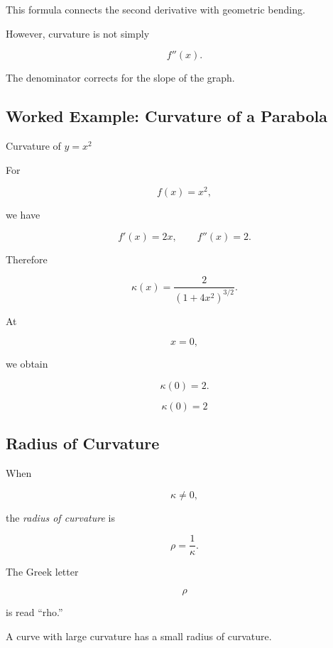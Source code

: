 This formula connects the second derivative with geometric bending.

However, curvature is not simply

\[
f''(x).
\]

The denominator corrects for the slope of the graph.

\subsection{Worked Example: Curvature of a Parabola}
\label{subsec:worked-curvature-parabola}

\begin{workedexamplebox}{Curvature of \(y=x^2\)}

For

\[
f(x)=x^2,
\]

we have

\[
f'(x)=2x,
\qquad
f''(x)=2.
\]

Therefore

\[
\kappa(x)
=
\frac{2}
{(1+4x^2)^{3/2}}.
\]

At

\[
x=0,
\]

we obtain

\[
\kappa(0)=2.
\]

\begin{answerbox}
\[
\boxed{\kappa(0)=2}
\]
\end{answerbox}
\end{workedexamplebox}

\subsection{Radius of Curvature}
\label{subsec:radius-of-curvature}

When

\[
\kappa\neq0,
\]

the \emph{radius of curvature} is

\[
\boxed{
\rho=\frac{1}{\kappa}.
}
\]

The Greek letter

\[
\rho
\]

is read ``rho.''

A curve with large curvature has a small radius of curvature.

